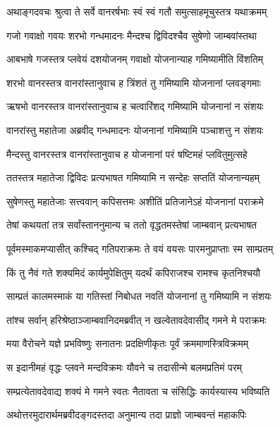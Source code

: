 
\twolineshloka
{अथाङ्गदवचः श्रुत्वा ते सर्वे वानरर्षभाः}
{स्वं स्वं गतौ समुत्साहमूचुस्तत्र यथाक्रमम्} %

\twolineshloka
{गजो गवाक्षो गवयः शरभो गन्धमादनः}
{मैन्दश्च द्विविदश्चैव सुषेणो जाम्बवांस्तथा} %

\twolineshloka
{आबभाषे गजस्तत्र प्लवेयं दशयोजनम्}
{गवाक्षो योजनान्याह गमिष्यामीति विंशतिम्} %

\twolineshloka
{शरभो वानरस्तत्र वानरांस्तानुवाच ह}
{त्रिंशतं तु गमिष्यामि योजनानां प्लवङ्गमाः} %

\twolineshloka
{ऋषभो वानरस्तत्र वानरांस्तानुवाच ह}
{चत्वारिंशद् गमिष्यामि योजनानां न संशयः} %

\twolineshloka
{वानरांस्तु महातेजा अब्रवीद् गन्धमादनः}
{योजनानां गमिष्यामि पञ्चाशत्तु न संशयः} %

\twolineshloka
{मैन्दस्तु वानरस्तत्र वानरांस्तानुवाच ह}
{योजनानां परं षष्टिमहं प्लवितुमुत्सहे} %

\twolineshloka
{ततस्तत्र महातेजा द्विविदः प्रत्यभाषत}
{गमिष्यामि न सन्देहः सप्ततिं योजनान्यहम्} %

\twolineshloka
{सुषेणस्तु महातेजाः सत्त्ववान् कपिसत्तमः}
{अशीतिं प्रतिजानेऽहं योजनानां पराक्रमे} %

\twolineshloka
{तेषां कथयतां तत्र सर्वांस्ताननुमान्य च}
{ततो वृद्धतमस्तेषां जाम्बवान् प्रत्यभाषत} %

\twolineshloka
{पूर्वमस्माकमप्यासीत् कश्चिद् गतिपराक्रमः}
{ते वयं वयसः पारमनुप्राप्ताः स्म साम्प्रतम्} %

\twolineshloka
{किं तु नैवं गते शक्यमिदं कार्यमुपेक्षितुम्}
{यदर्थं कपिराजश्च रामश्च कृतनिश्चयौ} %

\twolineshloka
{साम्प्रतं कालमस्माकं या गतिस्तां निबोधत}
{नवतिं योजनानां तु गमिष्यामि न संशयः} %

\twolineshloka
{तांश्च सर्वान् हरिश्रेष्ठाञ्जाम्बवानिदमब्रवीत्}
{न खल्वेतावदेवासीद् गमने मे पराक्रमः} %

\twolineshloka
{मया वैरोचने यज्ञे प्रभविष्णुः सनातनः}
{प्रदक्षिणीकृतः पूर्वं क्रममाणस्त्रिविक्रमम्} %

\twolineshloka
{स इदानीमहं वृद्धः प्लवने मन्दविक्रमः}
{यौवने च तदासीन्मे बलमप्रतिमं परम्} %

\twolineshloka
{सम्प्रत्येतावदेवाद्य शक्यं मे गमने स्वतः}
{नैतावता च संसिद्धिः कार्यस्यास्य भविष्यति} %

\twolineshloka
{अथोत्तरमुदारार्थमब्रवीदङ्गदस्तदा}
{अनुमान्य तदा प्राज्ञो जाम्बवन्तं महाकपिः} %

